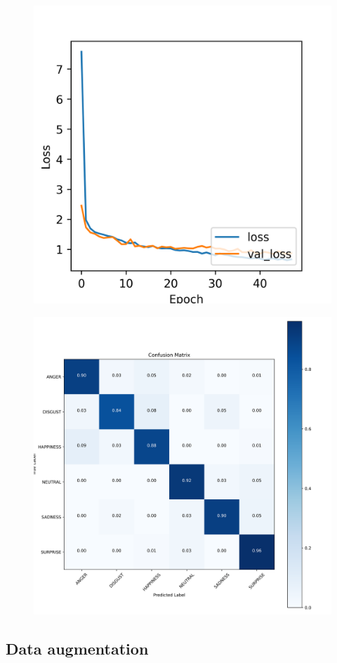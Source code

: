 \begin{figure}[H]
	\centering
	\includegraphics[width=.5\textwidth]{assets/results/preMELD.scratch/model.3dense/learning_history-loss.png}
	
	\label{fig:figure7}
\end{figure}

\begin{figure}[H]
	\centering
	\includegraphics[width=.95\textwidth]{assets/results/preMELD.scratch/model.3dense/confusion_matrix.png}
	
	\label{fig:cm3}
\end{figure}




\subsection{Data augmentation}

